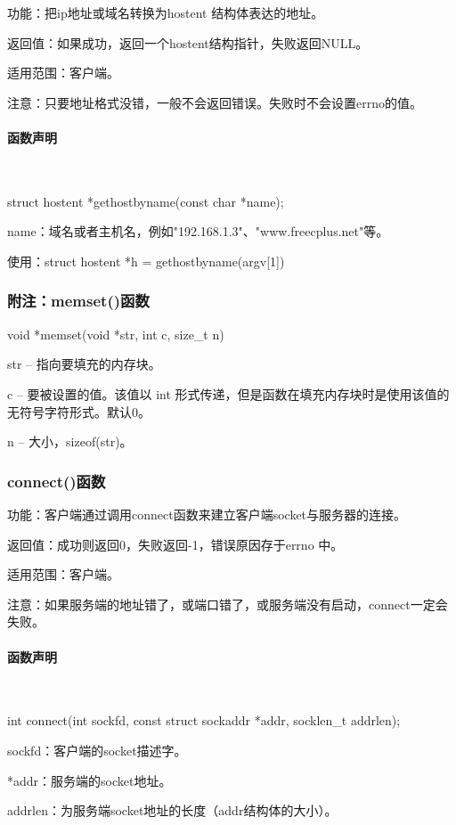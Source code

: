 \documentclass[UTF8]{article}%
\begin{document}
功能：把ip地址或域名转换为hostent 结构体表达的地址。

返回值：如果成功，返回一个hostent结构指针，失败返回NULL。

适用范围：客户端。

注意：只要地址格式没错，一般不会返回错误。失败时不会设置errno的值。

\paragraph{函数声明}~{}

struct hostent *gethostbyname(const char *name);

name：域名或者主机名，例如"192.168.1.3"、"www.freecplus.net"等。

使用：struct hostent *h = gethostbyname(argv[1])

\subsubsection{附注：memset()函数}

void *memset(void *str, int c, size\_t n)

str -- 指向要填充的内存块。

c -- 要被设置的值。该值以 int 形式传递，但是函数在填充内存块时是使用该值的无符号字符形式。默认0。

n -- 大小，sizeof(str)。

\subsubsection{connect()函数}

功能：客户端通过调用connect函数来建立客户端socket与服务器的连接。

返回值：成功则返回0，失败返回-1，错误原因存于errno 中。

适用范围：客户端。

注意：如果服务端的地址错了，或端口错了，或服务端没有启动，connect一定会失败。

\paragraph{函数声明}~{}

int connect(int sockfd, const struct sockaddr *addr, socklen\_t addrlen);

sockfd：客户端的socket描述字。

*addr：服务端的socket地址。

addrlen：为服务端socket地址的长度（addr结构体的大小）。
\end{document}
